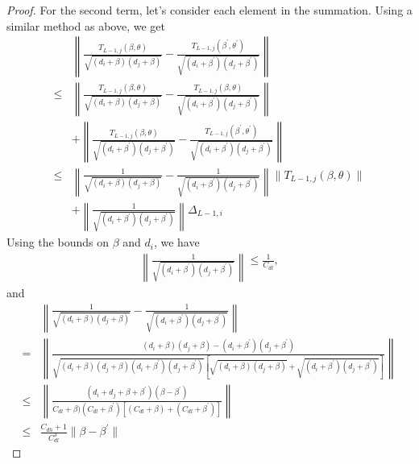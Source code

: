 \begin{proof}
For the second term, let's consider each element in the summation. Using a similar method as above, we get
\begin{align*}
    &\left\|\frac{T_{L-1, j}(\beta, \theta)}{\sqrt{(d_i+\beta)(d_j + \beta)}} - \frac{ T_{L-1, j}(\beta^\prime, \theta^\prime)}{\sqrt{(d_i+\beta^\prime)(d_j + \beta^\prime)}}\right\|\\
    \leq&\left\|\frac{T_{L-1, j}(\beta, \theta)}{\sqrt{(d_i+\beta)(d_j + \beta)}} 
    - \frac{ T_{L-1, j}(\beta, \theta)}{\sqrt{(d_i+\beta^\prime)(d_j + \beta^\prime)}}\right\|\\
    &+ \left\|\frac{T_{L-1, j}(\beta, \theta)}{\sqrt{(d_i+\beta^\prime)(d_j + \beta^\prime)}} 
    - \frac{ T_{L-1, j}(\beta^\prime, \theta^\prime)}{\sqrt{(d_i+\beta^\prime)(d_j + \beta^\prime)}}\right\| \tag{by triangle inequality}\\
    \leq& \left\|\frac{1}{\sqrt{(d_i+\beta)(d_j + \beta)}} 
    - \frac{1}{\sqrt{(d_i+\beta^\prime)(d_j + \beta^\prime)}}\right\|\|T_{L-1, j}(\beta, \theta)\| \\
    &+ \left\|\frac{1}{\sqrt{(d_i+\beta^\prime)(d_j + \beta^\prime)}}\right\|\Delta_{L-1, i} \tag{Cauchy-Schwarz inequality}
\end{align*}
Using the bounds on $\beta$ and $d_i$, we have 
\begin{align*}
    \left\|\frac{1}{\sqrt{(d_i+\beta^\prime)(d_j + \beta^\prime)}}\right\| \leq \frac{1}{C_{dl}},
\end{align*}
and
\begin{align*}
     &\left\|\frac{1}{\sqrt{(d_i+\beta)(d_j + \beta)}} 
    - \frac{1}{\sqrt{(d_i+\beta^\prime)(d_j + \beta^\prime)}}\right\|\\
    = & \left\|  \frac{(d_i+\beta)(d_j + \beta) - (d_i+\beta^\prime)(d_j + \beta^\prime)}{\sqrt{(d_i+\beta)(d_j + \beta)(d_i+\beta^\prime)(d_j + \beta^\prime)}[\sqrt{(d_i+\beta)(d_j + \beta)} + \sqrt{(d_i+\beta^\prime)(d_j + \beta^\prime)}]} \right\|
    \\
    \leq & \left\|  \frac{(d_i+d_j + \beta + \beta^\prime)(\beta-\beta^\prime)}{C_{dl}+\beta)(C_{dl}+\beta^\prime)[(C_{dl}+\beta)+ (C_{dl}+\beta^\prime)]} \right\|
    \\
    \leq &  \frac{C_{dh}+1}{C_{dl}^3} \|\beta-\beta^\prime\|

\end{align*}
\end{proof}

